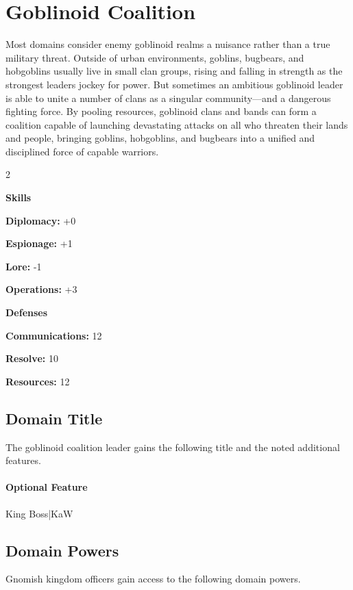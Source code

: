 \documentclass[10pt,a4paper,twoside,bg=print,twocolumn,openany,nodeprecatedcode]{dndbook}
\begin{document}
\section{Goblinoid Coalition}
Most domains consider enemy goblinoid realms a nuisance rather than a true military threat. Outside of urban environments, goblins, bugbears, and hobgoblins usually live in small clan groups, rising and falling in strength as the strongest leaders jockey for power. But sometimes an ambitious goblinoid leader is able to unite a number of clans as a singular community—and a dangerous fighting force. By pooling resources, goblinoid clans and bands can form a coalition capable of launching devastating attacks on all who threaten their lands and people, bringing goblins, hobgoblins, and bugbears into a unified and disciplined force of capable warriors.


\begin{itemize}
\begin{multicols}{2}
\item \textbf{Skills}
\item \textbf{Diplomacy:} +0
\item \textbf{Espionage:} +1
\item \textbf{Lore:} -1
\item \textbf{Operations:} +3
\item \textbf{Defenses}
\item \textbf{Communications:} 12
\item \textbf{Resolve:} 10
\item \textbf{Resources:} 12
\end{multicols}

\end{itemize}

\subsection{Domain Title}
The goblinoid coalition leader gains the following title and the noted additional features.

\paragraph{Optional Feature}
King Boss|KaW

\subsection{Domain Powers}
Gnomish kingdom officers gain access to the following domain powers.
\end{document}
